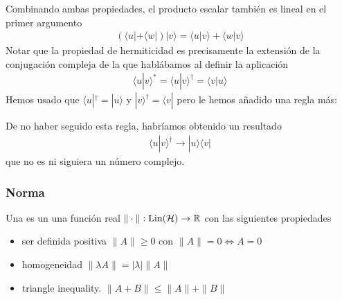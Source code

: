 \documentclass[letterpaper,10pt,english]{jupyterBook}
\newcommand{\bra}[1]{\langle #1|}
\newcommand{\ket}[1]{|#1\rangle}
\newcommand{\braket}[2]{\langle #1|#2\rangle}
\newcommand{\Hil}{{\cal H}}
\newcommand{\Lin}{\hbox{Lin}}
\begin{document}
\sphinxAtStartPar
Combinando ambas propiedades, el producto escalar también es lineal en el primer argumento
\begin{equation*}
\begin{split}(\bra{u}+\bra{w})\ket{v} = \braket{u}{v} + \braket{w}{v}\end{split}
\end{equation*}
\sphinxAtStartPar
Notar que la propiedad de hermiticidad es precisamente la extensión de la conjugación compleja de la que hablábamos al definir la aplicación 
\begin{equation*}
\begin{split}
\braket{u}{v}^* = \braket{u}{v}^\dagger  = \braket{v}{u}
\end{split}
\end{equation*}
\sphinxAtStartPar
Hemos usado que \(\bra{u}^\dagger = \ket{u}\) y  \(\ket{v}^\dagger = \bra{v}\) pero le hemos añadido una regla más:

\sphinxAtStartPar
De no haber seguido esta regla, habríamos obtenido un resultado 
\begin{equation*}
\begin{split}
\braket{u}{v}^\dagger \to \ket{u}\bra{v} 
 \end{split}
\end{equation*}
\sphinxAtStartPar
que no es ni siguiera un número complejo.

\sphinxAtStartPar



\subsubsection{Norma}
\label{\detokenize{docs/Part_01_Formalismo/Chapter_01_02_Formalismo_matem_xe1tico/01_02_Vectores_myst:norma}}
\sphinxAtStartPar
Una  es un una función real \(\|\cdot\| : \Lin(\Hil) \to {\mathbb R}\) con las siguientes propiedades
\begin{itemize}
\item {} 
\sphinxAtStartPar
ser definida positiva \(\|A\|\geq 0\) con \(\| A\| = 0 \Leftrightarrow A= 0\)

\item {} 
\sphinxAtStartPar
homogeneidad \(\|\lambda A\| = |\lambda| \|A\|\)

\item {} 
\sphinxAtStartPar
triangle inequality. \(\|A+B\| \leq \| A\| + \|B\|\)

\end{itemize}
\end{document}
